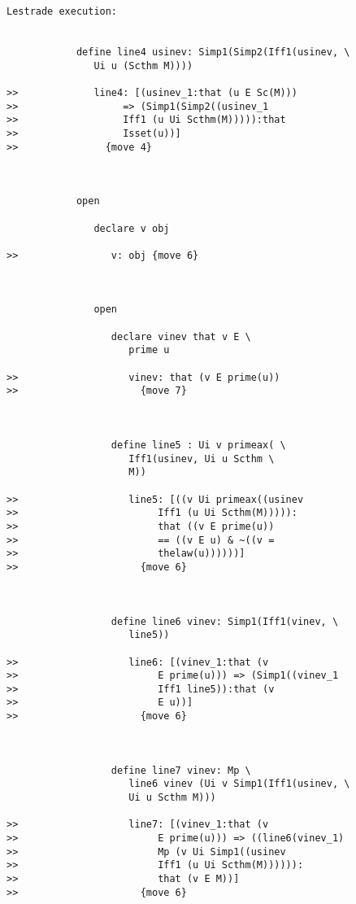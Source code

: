 \documentclass[12pt]{article}
\begin{document}
\begin{verbatim}Lestrade execution:


            define line4 usinev: Simp1(Simp2(Iff1(usinev, \
               Ui u (Scthm M))))

>>             line4: [(usinev_1:that (u E Sc(M)))
>>                  => (Simp1(Simp2((usinev_1
>>                  Iff1 (u Ui Scthm(M))))):that
>>                  Isset(u))]
>>               {move 4}



            open

               declare v obj

>>                v: obj {move 6}



               open

                  declare vinev that v E \
                     prime u

>>                   vinev: that (v E prime(u))
>>                     {move 7}



                  define line5 : Ui v primeax( \
                     Iff1(usinev, Ui u Scthm \
                     M))

>>                   line5: [((v Ui primeax((usinev
>>                        Iff1 (u Ui Scthm(M))))):
>>                        that ((v E prime(u))
>>                        == ((v E u) & ~((v =
>>                        thelaw(u))))))]
>>                     {move 6}



                  define line6 vinev: Simp1(Iff1(vinev, \
                     line5))

>>                   line6: [(vinev_1:that (v
>>                        E prime(u))) => (Simp1((vinev_1
>>                        Iff1 line5)):that (v
>>                        E u))]
>>                     {move 6}



                  define line7 vinev: Mp \
                     line6 vinev (Ui v Simp1(Iff1(usinev, \
                     Ui u Scthm M)))

>>                   line7: [(vinev_1:that (v
>>                        E prime(u))) => ((line6(vinev_1)
>>                        Mp (v Ui Simp1((usinev
>>                        Iff1 (u Ui Scthm(M)))))):
>>                        that (v E M))]
>>                     {move 6}




\end{verbatim}
\end{document}

